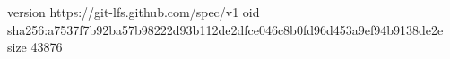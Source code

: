 version https://git-lfs.github.com/spec/v1
oid sha256:a7537f7b92ba57b98222d93b112de2dfce046c8b0fd96d453a9ef94b9138de2e
size 43876
